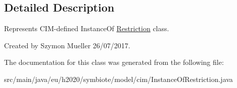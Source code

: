 \subsection{Detailed Description}
Represents C\+I\+M-\/defined Instance\+Of \hyperlink{classeu_1_1h2020_1_1symbiote_1_1model_1_1cim_1_1Restriction}{Restriction} class.

Created by Szymon Mueller 26/07/2017. 

The documentation for this class was generated from the following file\+:\begin{DoxyCompactItemize}
\item 
src/main/java/eu/h2020/symbiote/model/cim/Instance\+Of\+Restriction.\+java\end{DoxyCompactItemize}
